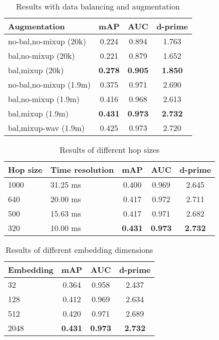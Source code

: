 \documentclass[journal]{IEEEtran}
\begin{document}
\begin{table}[t]
\centering
\caption{Results with data balancing and augmentation}
\label{table:augmentation}
\begin{tabular}{lccc}
 \toprule
 Augmentation & mAP & AUC & d-prime \\
 \midrule
 no-bal,no-mixup (20k) & 0.224 & 0.894 & 1.763 \\
 bal,no-mixup (20k) & 0.221 & 0.879 & 1.652 \\
 bal,mixup (20k) & \textbf{0.278} & \textbf{0.905} & \textbf{1.850} \\
 \midrule
 no-bal,no-mixup (1.9m) & 0.375 & 0.971 & 2.690 \\
 bal,no-mixup (1.9m) & 0.416 & 0.968 & 2.613 \\
 bal,mixup (1.9m) & \textbf{0.431} & \textbf{0.973} & \textbf{2.732} \\
 bal,mixup-wav (1.9m) & 0.425 & 0.973 & 2.720 \\
 \bottomrule
\end{tabular}
\end{table}

\begin{table}[t]
\centering
\caption{Results of different hop sizes}
\label{table:hop_size}
\begin{tabular}{llccc}
 \toprule
 Hop size & Time resolution & mAP & AUC & d-prime \\
 \midrule
 1000 & 31.25 ms & 0.400 & 0.969 & 2.645 \\
 640 & 20.00 ms & 0.417 & 0.972 & 2.711 \\
 500 & 15.63 ms & 0.417 & 0.971 & 2.682 \\
 320 & 10.00 ms & \textbf{0.431} & \textbf{0.973} & \textbf{2.732} \\
 \bottomrule
\end{tabular}
\end{table}

\begin{table}[t]
\centering
\caption{Results of different embedding dimensions}
\label{table:embedding_dimensions}
\begin{tabular}{lccc}
 \toprule
 Embedding & mAP & AUC & d-prime \\
 \midrule
 32 & 0.364 & 0.958 & 2.437 \\
 128 & 0.412 & 0.969 & 2.634 \\
 512 & 0.420 & 0.971 & 2.689 \\
 2048 & \textbf{0.431} & \textbf{0.973} & \textbf{2.732} \\
 \bottomrule
\end{tabular}
\end{table}
\end{document}
